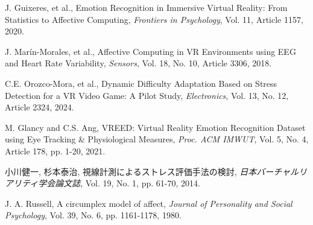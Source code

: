 \documentclass[a4paper]{jarticle}
\begin{document}
\begin{thebibliography}{10}

J. Guixeres, et al., Emotion Recognition in Immersive Virtual Reality: From Statistics to Affective Computing, \textit{Frontiers in Psychology}, Vol. 11, Article 1157, 2020.
    
J. Marín-Morales, et al., Affective Computing in VR Environments using EEG and Heart Rate Variability, \textit{Sensors}, Vol. 18, No. 10, Article 3306, 2018.
    
C.E. Orozco-Mora, et al., Dynamic Difficulty Adaptation Based on Stress Detection for a VR Video Game: A Pilot Study, \textit{Electronics}, Vol. 13, No. 12, Article 2324, 2024.
    
M. Glancy and C.S. Ang, VREED: Virtual Reality Emotion Recognition Dataset using Eye Tracking \& Physiological Measures, \textit{Proc. ACM IMWUT}, Vol. 5, No. 4, Article 178, pp. 1-20, 2021.

小川健一, 杉本泰治, 視線計測によるストレス評価手法の検討, \textit{日本バーチャルリアリティ学会論文誌}, Vol. 19, No. 1, pp. 61-70, 2014. 

J. A. Russell, A circumplex model of affect, \textit{Journal of Personality and Social Psychology}, Vol. 39, No. 6, pp. 1161-1178, 1980.

\end{thebibliography}
\end{document}
